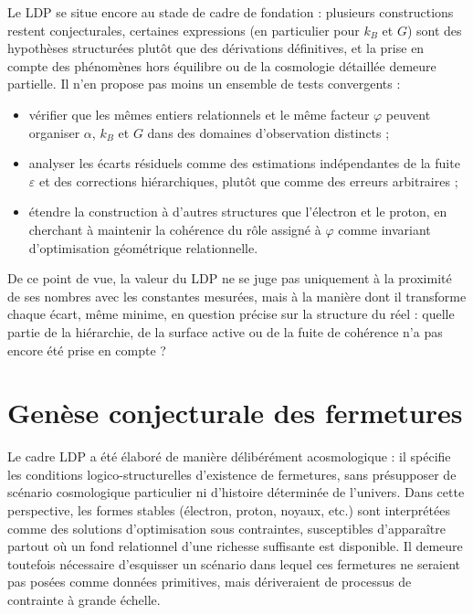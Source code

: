 \documentclass[11pt,a4paper]{article}
\begin{document}
Le LDP se situe encore au stade de cadre de fondation : plusieurs constructions restent conjecturales, certaines expressions (en particulier pour \(k_B\) et \(G\)) sont des hypothèses structurées plutôt que des dérivations définitives, et la prise en compte des phénomènes hors équilibre ou de la cosmologie détaillée demeure partielle. Il n’en propose pas moins un ensemble de tests convergents :
\begin{itemize}
  \item vérifier que les mêmes entiers relationnels et le même facteur \(\varphi\) peuvent organiser \(\alpha\), \(k_B\) et \(G\) dans des domaines d’observation distincts ; 
  \item analyser les écarts résiduels comme des estimations indépendantes de la fuite \(\varepsilon\) et des corrections hiérarchiques, plutôt que comme des erreurs arbitraires ; 
  \item étendre la construction à d’autres structures que l’électron et le proton, en cherchant à maintenir la cohérence du rôle assigné à \(\varphi\) comme invariant d’optimisation géométrique relationnelle.
\end{itemize}

De ce point de vue, la valeur du LDP ne se juge pas uniquement à la proximité de ses nombres avec les constantes mesurées, mais à la manière dont il transforme chaque écart, même minime, en question précise sur la structure du réel : quelle partie de la hiérarchie, de la surface active ou de la fuite de cohérence n’a pas encore été prise en compte ? 

\section{Genèse conjecturale des fermetures}

Le cadre LDP a été élaboré de manière délibérément acosmologique : il spécifie les conditions logico-structurelles d’existence de fermetures, sans présupposer de scénario cosmologique particulier ni d’histoire déterminée de l’univers. Dans cette perspective, les formes stables (électron, proton, noyaux, etc.) sont interprétées comme des solutions d’optimisation sous contraintes, susceptibles d’apparaître partout où un fond relationnel d’une richesse suffisante est disponible. Il demeure toutefois nécessaire d’esquisser un scénario dans lequel ces fermetures ne seraient pas posées comme données primitives, mais dériveraient de processus de contrainte à grande échelle.
\end{document}
